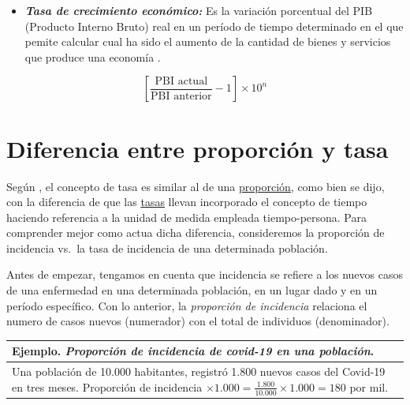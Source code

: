 \documentclass[
]{book}
\providecommand{\tightlist}{%
  \setlength{\itemsep}{0pt}\setlength{\parskip}{0pt}}
\begin{document}
\begin{itemize}
\tightlist
\item
  \textbf{\emph{Tasa de crecimiento económico:}} Es la variación porcentual del PIB (Producto Interno Bruto) real en un período de tiempo determinado en el que pemite calcular cual ha sido el aumento de la cantidad de bienes y servicios que produce una economía \citep{de2009producto}.
\end{itemize}

\[\begin{equation}
\left[\frac{\text{PBI actual}}{\text{PBI anterior}}-1\right]\times 10^{n}
\end{equation}\]

\hypertarget{diferencia-entre-proporciuxf3n-y-tasa}{%
\chapter{Diferencia entre proporción y tasa}\label{diferencia-entre-proporciuxf3n-y-tasa}}

Según \citep{colimon1990fundamentos}, el concepto de tasa es similar al de una \protect\hyperlink{proporciuxf3n}{proporción}, como bien se dijo, con la diferencia de que las \protect\hyperlink{tasas}{tasas} llevan incorporado el concepto de tiempo haciendo referencia a la unidad de medida empleada tiempo-persona. Para comprender mejor como actua dicha diferencia, consideremos la proporción de incidencia vs.~la tasa de incidencia de una determinada población.

Antes de empezar, tengamos en cuenta que incidencia se refiere a los nuevos casos de una enfermedad en una determinada población, en un lugar dado y en un período específico. Con lo anterior, la \emph{proporción de incidencia} relaciona el numero de casos nuevos (numerador) con el total de individuos (denominador).

\begin{longtable}[]{@{}l@{}}
\toprule
\begin{minipage}[b]{0.97\columnwidth}\raggedright
Ejemplo. \emph{Proporción de incidencia de covid-19 en una población}.\strut
\end{minipage}\tabularnewline
\midrule
\endhead
\begin{minipage}[t]{0.97\columnwidth}\raggedright
Una población de 10.000 habitantes, registró 1.800 nuevos casos del Covid-19 en tres meses. Proporción de incidencia \(\times 1.000=\frac{1.800}{10.000}\times 1.000=180\) por mil.\strut
\end{minipage}\tabularnewline
\bottomrule
\end{longtable}
\end{document}
